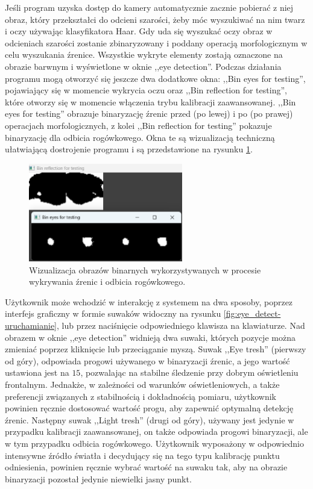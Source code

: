 \documentclass[a4paper,twoside,12pt]{book}
\begin{document}
Jeśli program uzyska dostęp do kamery automatycznie zacznie pobierać z niej obraz, który przekształci do odcieni szarości, żeby móc wyszukiwać na nim twarz i oczy używając klasyfikatora Haar. Gdy uda się wyszukać oczy obraz w odcieniach szarości zostanie zbinaryzowany i poddany operacją morfologicznym w celu wyszukania źrenice. Wszystkie wykryte elementy zostają oznaczone na obrazie barwnym i wyświetlone w oknie ,,eye detection''. Podczas działania programu mogą otworzyć się jeszcze dwa dodatkowe okna: ,,Bin eyes for testing'', pojawiający się w momencie wykrycia oczu oraz ,,Bin reflection for testing'', które otworzy się w momencie włączenia trybu kalibracji zaawansowanej. ,,Bin eyes for testing'' obrazuje binaryzację źrenic przed (po lewej) i po (po prawej) operacjach morfologicznych, z kolei ,,Bin reflection for testing'' pokazuje binaryzację dla odbicia rogówkowego. Okna te są wizualizacją techniczną ułatwiającą dostrojenie programu i są przedstawione na rysunku \ref{fig:eye_detect-okna-bin}.

\begin{figure}[htbp]
	\centering
	\includegraphics[width=0.6\textwidth]{pic/obsługa/okna binarne.png}
	\caption{Wizualizacja obrazów binarnych wykorzystywanych w procesie wykrywania źrenic i odbicia rogówkowego.}
	\label{fig:eye_detect-okna-bin}
\end{figure}

Użytkownik może wchodzić w interakcję z systemem na dwa sposoby, poprzez interfejs graficzny w formie suwaków widoczny na rysunku \ref{fig:eye_detect-uruchamianie}, lub przez naciśnięcie odpowiedniego klawisza na klawiaturze. Nad obrazem w oknie ,,eye detection'' widnieją dwa suwaki, których pozycje można zmieniać poprzez kliknięcie lub przeciąganie myszą. Suwak ,,Eye tresh'' (pierwszy od góry), odpowiada progowi używanego w binaryzacji źrenic, a jego wartość ustawiona jest na $15$, pozwalając na stabilne śledzenie przy dobrym oświetleniu frontalnym. Jednakże, w zależności od warunków oświetleniowych, a także preferencji związanych z stabilnością i dokładnością pomiaru, użytkownik powinien ręcznie dostosować wartość progu, aby zapewnić optymalną detekcję źrenic. Następny suwak ,,Light tresh'' (drugi od góry), używany jest jedynie w przypadku kalibracji zaawansowanej, on także odpowiada progowi binaryzacji, ale w tym przypadku odbicia rogówkowego. Użytkownik wyposażony w odpowiednio intensywne źródło światła i decydujący się na tego typu kalibrację punktu odniesienia, powinien ręcznie wybrać wartość na suwaku tak, aby na obrazie binaryzacji pozostał jedynie niewielki jasny punkt. 
\end{document}
